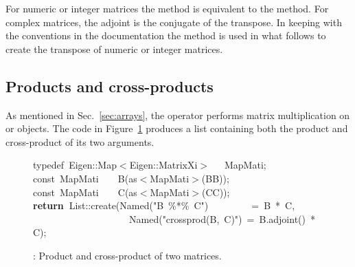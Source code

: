 \documentclass[shortnames,article,nojss]{jss}
\newcommand{\hlstd}[1]{\textcolor[rgb]{0,0,0}{#1}}
\newcommand{\hlopt}[1]{\textcolor[rgb]{0,0,0}{#1}}
\newcommand{\hlstr}[1]{\textcolor[rgb]{0.90,0.15,0.15}{#1}}
\newcommand{\hlkwa}[1]{\textcolor[rgb]{0.61,0.13,0.93}{\bf{#1}}}
\newcommand{\hlkwb}[1]{\textcolor[rgb]{0.13,0.54,0.13}{#1}}
\newcommand{\hlkwc}[1]{\textcolor[rgb]{0,0,1}{#1}}
\newcommand{\hlkwd}[1]{\textcolor[rgb]{0,0,0}{#1}}
\begin{document}
For numeric or integer matrices the  method is
equivalent to the  method.  For complex matrices,
the adjoint is the conjugate of the transpose.  In keeping with the
conventions in the  documentation the 
method is used in what follows to create the transpose of numeric or
integer matrices.


\subsection{Products and cross-products}
\label{sec:products}

As mentioned in Sec.~\ref{sec:arrays}, the  operator
performs matrix multiplication on  or
 objects. The  code in
Figure~\ref{prod} produces a list containing both the product and
cross-product of its two arguments.

\begin{figure}[htb]
  \noindent
  \ttfamily
  \hlstd{}\hlkwc{typedef\ }\hlstd{Eigen}\hlopt{::}\hlstd{Map}\hlopt{$<$}\hlstd{Eigen}\hlopt{::}\hlstd{MatrixXi}\hlopt{$>$}\hlstd{\ \ \ }\hlopt{}\hlstd{MapMati}\hlopt{;}\hspace*{\fill}\\
  \hlstd{}\hlkwb{const\ }\hlstd{MapMati}\hlstd{\ \ \ \ }\hlstd{}\hlkwd{B}\hlstd{}\hlopt{(}\hlstd{as}\hlopt{$<$}\hlstd{MapMati}\hlopt{$>$(}\hlstd{BB}\hlopt{));}\hspace*{\fill}\\
  \hlstd{}\hlkwb{const\ }\hlstd{MapMati}\hlstd{\ \ \ \ }\hlstd{}\hlkwd{C}\hlstd{}\hlopt{(}\hlstd{as}\hlopt{$<$}\hlstd{MapMati}\hlopt{$>$(}\hlstd{CC}\hlopt{));}\hspace*{\fill}\\
  \hlstd{}\hlkwa{return\ }\hlstd{List}\hlopt{::}\hlstd{}\hlkwd{create}\hlstd{}\hlopt{(}\hlstd{Named}\hlopt{{(}}\hlstd{}\hlstr{"B\ \%{*}\%\ C"}\hlstd{}\hlopt{{)}}\hlstd{\ \ \ \ \ \ \ \ \ }\hlopt{=\ }\hlstd{B\ }\hlopt{{*}\ }\hlstd{C}\hlopt{,}\hspace*{\fill}\\
  \hlstd{}\hlstd{\ \ \ \ \ \ \ \ \ \ \ \ \ \ \ \ \ \ \ \ }\hlstd{Named}\hlopt{{(}}\hlstd{}\hlstr{"crossprod(B,\ C)"}\hlstd{}\hlopt{{)}\ =\ }\hlstd{B}\hlopt{.}\hlstd{}\hlkwd{adjoint}\hlstd{}\hlopt{()\ {*}\ }\hlstd{C}\hlopt{);}\hlstd{}\hspace*{\fill}\\
  \mbox{}
  \normalfont
  \normalsize
  \caption{: Product and cross-product of two matrices.}
  \label{prod}
\end{figure}
\end{document}
